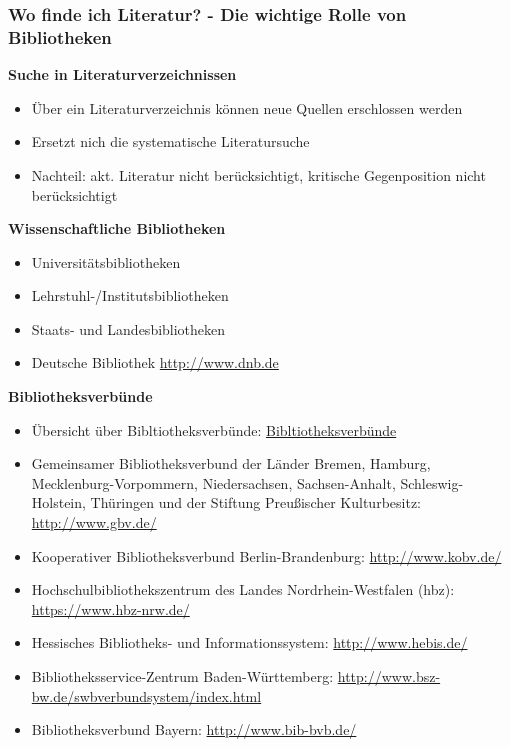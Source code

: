 \subsubsection{Wo finde ich Literatur? - Die wichtige Rolle von
Bibliotheken}\label{wo-finde-ich-literatur-die-wichtige-rolle-von-bibliotheken}

\textbf{Suche in Literaturverzeichnissen}

\begin{itemize}%
\item
  Über ein Literaturverzeichnis können neue Quellen erschlossen werden
\item
  Ersetzt nich die systematische Literatursuche
\item
  Nachteil: akt. Literatur nicht berücksichtigt, kritische Gegenposition
  nicht berücksichtigt
\end{itemize}

\textbf{Wissenschaftliche Bibliotheken}

\begin{itemize}%
\item
  Universitätsbibliotheken
\item
  Lehrstuhl-/Institutsbibliotheken
\item
  Staats- und Landesbibliotheken
\item
  Deutsche Bibliothek \url{http://www.dnb.de}
\end{itemize}

\textbf{Bibliotheksverbünde}

\begin{itemize}%
\item
  Übersicht über Bibltiotheksverbünde:
  \href{http://www.bibliotheksportal.de/bibliotheken/bibliotheken-in-deutschland/bibliothekslandschaft/bibliotheksverbuende.html\#c3445}{Bibltiotheksverbünde}
\item
  Gemeinsamer Bibliotheksverbund der Länder Bremen, Hamburg,
  Mecklenburg-Vorpommern, Niedersachsen, Sachsen-Anhalt,
  Schleswig-Holstein, Thüringen und der Stiftung Preußischer
  Kulturbesitz: \url{http://www.gbv.de/}
\item
  Kooperativer Bibliotheksverbund Berlin-Brandenburg:
  \url{http://www.kobv.de/}
\item
  Hochschulbibliothekszentrum des Landes Nordrhein-Westfalen (hbz):
  \url{https://www.hbz-nrw.de/}
\item
  Hessisches Bibliotheks- und Informationssystem:
  \url{http://www.hebis.de/}
\item
  Bibliotheksservice-Zentrum Baden-Württemberg:
  \url{http://www.bsz-bw.de/swbverbundsystem/index.html}
\item
  Bibliotheksverbund Bayern: \url{http://www.bib-bvb.de/}
\end{itemize}

